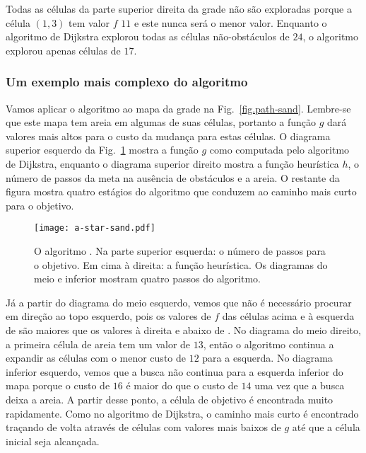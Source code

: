 Todas as células da parte superior direita da grade não são exploradas porque a célula $(1,3)$ tem valor $f$ $11$ e este nunca será o menor valor. Enquanto o algoritmo de Dijkstra explorou todas as células não-obstáculos de $24$, o algoritmo \astar{} explorou apenas células de $17$.

\subsubsection*{Um exemplo mais complexo do algoritmo \astar}

Vamos aplicar o algoritmo \astar{} ao mapa da grade na Fig.~\ref{fig.path-sand}. Lembre-se que este mapa tem areia em algumas de suas células, portanto a função $g$ dará valores mais altos para o custo da mudança para estas células. O diagrama superior esquerdo da Fig.~\ref{fig.a-star} mostra a função $g$ como computada pelo algoritmo de Dijkstra, enquanto o diagrama superior direito mostra a função heurística $h$, o número de passos da meta na ausência de obstáculos e a areia. O restante da figura mostra quatro estágios do algoritmo que conduzem ao caminho mais curto para o objetivo.

\begin{figure}
\begin{center}
\texttt{[image: a-star-sand.pdf]}
\end{center}
\caption{O algoritmo \astar{}. Na parte superior esquerda: o número de passos para o objetivo. Em cima à direita: a função heurística. Os diagramas do meio e inferior mostram quatro passos do algoritmo.}\label{fig.a-star}
\end{figure}

Já a partir do diagrama do meio esquerdo, vemos que não é necessário procurar em direção ao topo esquerdo, pois os valores de $f$ das células acima e à esquerda de  são maiores que os valores à direita e abaixo de . No diagrama do meio direito, a primeira célula de areia tem um valor de $13$, então o algoritmo continua a expandir as células com o menor custo de $12$ para a esquerda. No diagrama inferior esquerdo, vemos que a busca não continua para a esquerda inferior do mapa porque o custo de $16$ é maior do que o custo de $14$ uma vez que a busca deixa a areia. A partir desse ponto, a célula de objetivo  é encontrada muito rapidamente. Como no algoritmo de Dijkstra, o caminho mais curto é encontrado traçando de volta através de células com valores mais baixos de $g$ até que a célula inicial seja alcançada.

